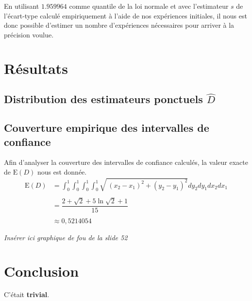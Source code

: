 \documentclass[paper=a4, fontsize=11pt]{scrartcl}
\begin{document}
En utilisant $1.959964$ comme quantile de la loi normale et avec l'estimateur $s$ de l'écart-type calculé empiriquement à l'aide de nos expériences initiales, il nous est donc possible d'estimer un nombre d'expériences nécessaires pour arriver à la précision voulue.

\section{Résultats}

\subsection{Distribution des estimateurs ponctuels $\widehat{D}$}

\subsection{Couverture empirique des intervalles de confiance}

Afin d'analyser la couverture des intervalles de confiance calculés, la valeur exacte de $\text{E}(D)$ nous est donnée.
\begin{align*}
  \text{E}(D) &= \int _0^1\int _0^1\int _0^1\int _0^1\sqrt{\:\left(x_2-x_1\right)^2+\left(y_2-y_1\right)^2}dy_2dy_1dx_2dx_1 \\ \\
  &= \dfrac{2 + \sqrt{2} + 5\ln{\sqrt{2} + 1}}{15} \\ \\
  &\approx 0,5214054
\end{align*}

\textit{Insérer ici graphique de fou de la slide 52}

\section{Conclusion}

C'était \textbf{trivial}.
\end{document}
